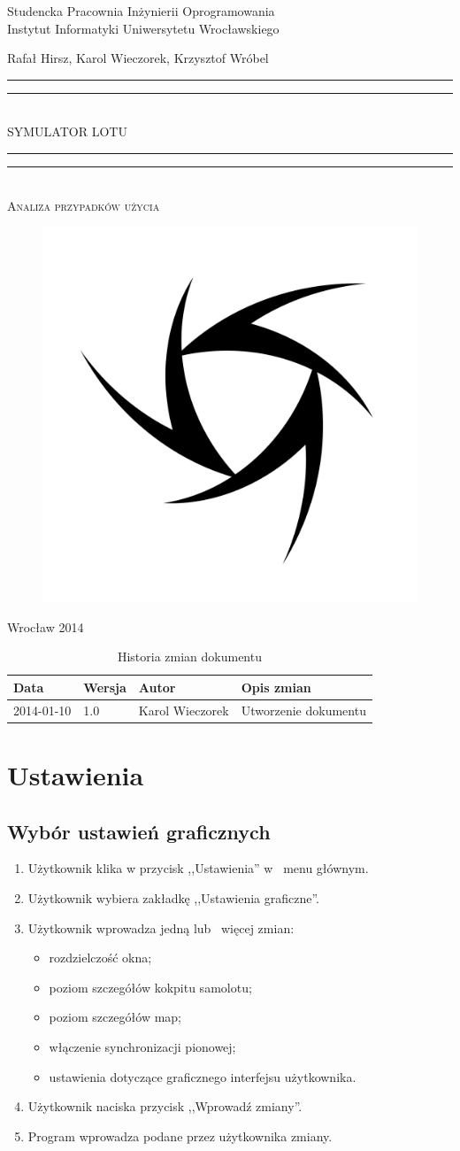 \documentclass{mwrep}
\newcommand*{\titleGP}{\begingroup
\centering

{\large Studencka Pracownia Inżynierii Oprogramowania}\\Instytut Informatyki Uniwersytetu Wrocławskiego\par
\vspace*{16\baselineskip}

{\Large Rafał Hirsz, Karol Wieczorek, Krzysztof Wróbel\par}
\vspace*{\baselineskip}

\rule{\textwidth}{1.6pt}\vspace*{-\baselineskip}\vspace*{2pt}
\rule{\textwidth}{0.4pt}\\[\baselineskip]

{\Huge SYMULATOR LOTU}\\[0.2\baselineskip]

\rule{\textwidth}{0.4pt}\vspace*{-\baselineskip}\vspace{3.2pt}
\rule{\textwidth}{1.6pt}\\[\baselineskip]

\scshape
{\huge Analiza przypadków użycia}\par
\vspace*{2\baselineskip}

\begin{figure}[h]
\centering
\includegraphics[width=5\baselineskip]{flightsim-team-logo.pdf}
\end{figure}
\vfill

{\large Wrocław 2014}\par

\pagebreak

\endgroup}
\begin{document}
\thispagestyle{empty}
\titleGP

\begin{center}
\begin{table}[h]
\begin{center}
\caption{Historia zmian dokumentu}\label{T:Zmiany}
\vspace{3ex}
\begin{tabularx}{1\textwidth}{|l|l|l|X|}
\hline
Data & Wersja & Autor & Opis zmian \\ \hline
2014-01-10 & 1.0 & Karol Wieczorek & Utworzenie dokumentu \\
\hline
\end{tabularx}
\end{center}
\end{table}
\end{center}

\pagebreak

\tableofcontents

\chapter{Ustawienia}
\section{Wybór ustawień graficznych}
\begin{enumerate}
  \item Użytkownik klika w przycisk ,,Ustawienia'' w~ menu głównym.
  \item Użytkownik wybiera zakładkę ,,Ustawienia graficzne''.
  \item Użytkownik wprowadza jedną lub~ więcej zmian:
    \begin{itemize}
      \item rozdzielczość okna;
      \item poziom szczegółów kokpitu samolotu;
      \item poziom szczegółów map;
      \item włączenie synchronizacji pionowej;
      \item ustawienia dotyczące graficznego interfejsu użytkownika.
    \end{itemize}
  \item Użytkownik naciska przycisk ,,Wprowadź zmiany''.
  \item Program wprowadza podane przez użytkownika zmiany.
\end{enumerate}
\end{document}
